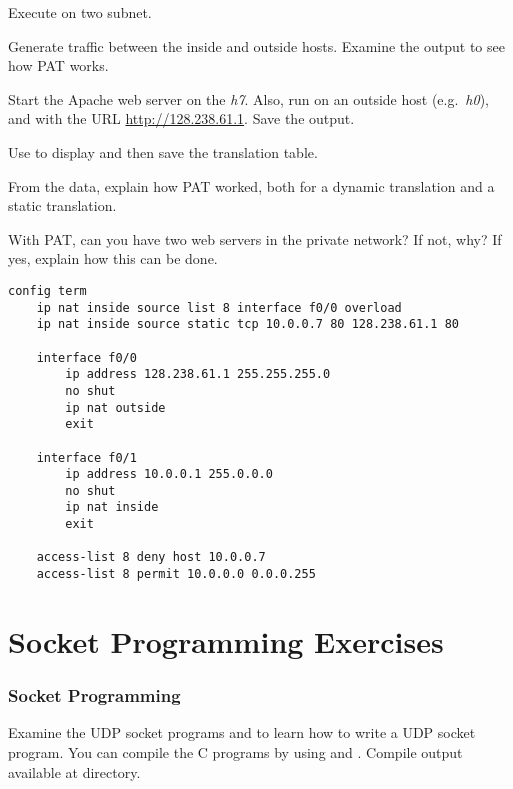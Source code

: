 \documentclass{../UTNetLab}
\begin{document}
Execute  on two subnet.

Generate traffic between the inside and outside hosts.
Examine the  output to see how PAT works.

Start the Apache web server on the \textit{h7}.
Also, run  on an outside host (e.g.\ \textit{h0}), and with the URL \url{http://128.238.61.1}.
Save the  output.

Use  to display and then save the translation table.

\begin{report}
    \item From the  data, explain how PAT worked, both for a dynamic translation and a static translation.

    \item With PAT, can you have two web servers in the private network?
    If not, why?
    If yes, explain how this can be done.
\end{report}

\begin{lstlisting}[language={cisco}, caption={PAT Router Configuration in \hyperref[fig:8.7]{Figure~8.7} (Table~8.6)\label{tab:8.6}}]
config term
    ip nat inside source list 8 interface f0/0 overload
    ip nat inside source static tcp 10.0.0.7 80 128.238.61.1 80

    interface f0/0
        ip address 128.238.61.1 255.255.255.0
        no shut
        ip nat outside
        exit

    interface f0/1
        ip address 10.0.0.1 255.0.0.0
        no shut
        ip nat inside
        exit

    access-list 8 deny host 10.0.0.7
    access-list 8 permit 10.0.0.0 0.0.0.255
    \end{lstlisting}

\part{Socket Programming Exercises}
\section{Socket Programming}
Examine the UDP socket programs  and  to learn how to write a UDP socket program.
You can compile the C programs by using  and .
Compile output available at  directory.
\end{document}
